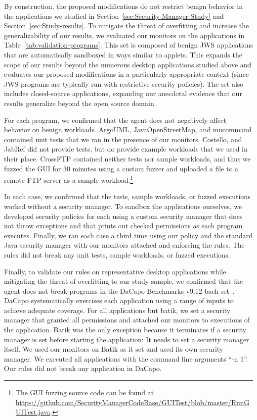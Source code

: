 \documentclass{sig-alternate}
\begin{document}
By construction, the proposed modifications do not restrict
benign behavior in the applications we studied in
Section~\ref{sec:Security-Manager-Study} and Section~\ref{sec:Study-results}.
To mitigate the threat of overfitting and increase the generalizability of our results, we 
evaluated our monitors on the applications
in Table~\ref{tab:validation-programs}. This set is composed of benign JWS
applications that are automatically sandboxed in ways similar to applets.  This
expands the scope of our results beyond the numerous desktop applications
studied above and evaluates our proposed modifications in a particularly
appropriate context (since JWS programs are typically run with restrictive
security policies).  The set also includes closed-source applications,
expanding our anecdotal evidence that our results generalize beyond the open
source domain.

For each program, we confirmed that the agent does not negatively affect
behavior on benign workloads. ArgoUML, JavaOpenStreetMap, and mucommand 
contained unit tests that we ran in the presence of our monitors. Costello, and
JabRef did not provide tests, but do provide example workloads that we used
in their place. CrossFTP contained neither tests nor sample workloads, and thus
we fuzzed the GUI for 30 minutes using a custom fuzzer and uploaded a file to a
remote FTP server as a sample workload.\footnote{The GUI fuzzing source code can
  be found at
  \url{https://github.com/SecurityManagerCodeBase/GUITest/blob/master/RunGUITest.java}.} 

In each case, we confirmed that the tests, sample workloads, or fuzzed executions
worked without a security manager. To sandbox the applications ourselves,
we developed security policies for each using a custom security manager that does not throw exceptions 
and that prints out checked permissions as each program executes. Finally, we
ran each case a third time 
using our policy and the standard Java security manager with our monitors
attached and enforcing the rules. The rules did not break any unit tests, sample
workloads, or fuzzed executions.

Finally, to validate our rules on representative desktop applications while
mitigating the threat of overfitting to our study sample, we confirmed that the
agent does not break programs in the DaCapo Benchmarks v9.12-bach set~\cite{dacapo}. 
DaCapo systematically exercises each application using a range of inputs to achieve
adequate coverage. For all
applications but batik, we set a security manager that granted all
permissions and attached our monitors to executions of the application. Batik was the only
exception because it terminates if a security manager is set before starting the application: It needs to set a security manager itself. We used our monitors on Batik as it set and used its
own security manager. We executed all applications with the command line arguments ``-n 1''. 
Our rules did not break any application in DaCapo.
\end{document}
